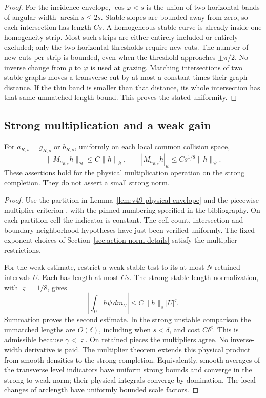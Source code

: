 \begin{proof}
For the incidence envelope, $\cos\varphi<s$ is the union of two
horizontal bands of angular width $\arcsin s\le2s$. Stable slopes
are bounded away from zero, so each intersection has length $Cs$.
A homogeneous stable curve is already inside one homogeneity strip.
Most such strips are either entirely included or entirely excluded;
only the two horizontal thresholds require new cuts. The number of
new cuts per strip is bounded, even when the threshold approaches
$\pm\pi/2$. No inverse change from $p$ to $\varphi$ is used at grazing.
Matching intersections of two stable graphs moves a transverse cut
by at most a constant times their graph distance. If the thin band is
smaller than that distance, its whole intersection has that same
unmatched-length bound. This proves the stated uniformity.
\end{proof}

\subsection{Strong multiplication and a weak gain}
\begin{proposition}
\label{prop:v49-physical-multiplier}
For $a_{R,s}=g_{R,s}$ or $b_{R,s}^-$, uniformly on each local common
collision space,
\begin{equation}\label{eq:v49-physical-multiplier}
 \|M_{a_{R,s}}h\|_{\mathcal B}\le C\|h\|_{\mathcal B},\qquad
 |M_{a_{R,s}}h|_w\le Cs^{1/8}\|h\|_{\mathcal B}.
\end{equation}
These assertions hold for the physical multiplication operation on
the strong completion. They do not assert a small strong norm.
\end{proposition}
\begin{proof}
Use the partition in Lemma~\ref{lem:v49-physical-envelope} and the
piecewise multiplier criterion \cite[Lemma 3.3(b), p.~13]{DPZ}, with
the pinned numbering specified in the bibliography. On each partition
cell the indicator is constant. The cell-count, intersection and
boundary-neighborhood hypotheses have just been verified uniformly.
The fixed exponent choices of Section~\ref{sec:action-norm-details}
satisfy the multiplier restrictions.

For the weak estimate, restrict a weak stable test to its at most
$N$ retained intervals $U$. Each has length at most $Cs$. The strong
stable length normalization, with $\varsigma=1/8$, gives
\[
 \left|\int_U h\psi\,dm_U\right|
              \le C\|h\|_s|U|^{\varsigma}.
\]
Summation proves the second estimate. In the strong unstable
comparison the unmatched lengths are $O(\delta)$, including when
$s<\delta$, and cost $C\delta^{\varsigma}$. This is admissible
because $\gamma<\varsigma$. On retained pieces the multipliers
agree. No inverse-width derivative is paid. The multiplier theorem
extends this physical product from smooth densities to the strong
completion. Equivalently, smooth averages of the transverse level
indicators have uniform strong bounds and converge in the
strong-to-weak norm; their physical integrals converge by domination.
The local changes of arclength have uniformly bounded scale factors.
\end{proof}

